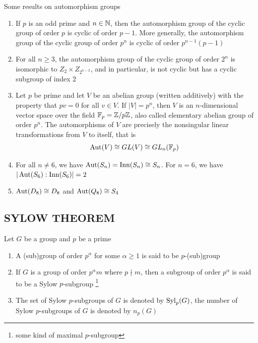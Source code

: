 \begin{proposition}
	Some results on automorphism groups
	\begin{enumerate}
		\item If $p$ is an odd prime and $n \in \mathbb{N}$, then the automorphism group of the cyclic group of order $p$ is cyclic of order $p-1$. More generally, the automorphism group of the cyclic group of order $p^n$ is cyclic of order $p^{n-1}(p-1)$
		\item For all $n \geq 3$, the automorphism group of the cyclic group of order $2^n$ is isomorphic to $Z_2 \times Z_{2^{n-2}}$, and in particular, is not cyclic but has a cyclic subgroup of index 2
		\item Let $p$ be prime and let $V$ be an abelian group (written additively) with the property that $pv = 0$ for all $v \in V$. If $|V| = p^n$, then $V$ is an $n$-dimensional vector space over the field $\mathbb{F}_p = \mathbb{Z} / p\mathbb{Z}$, also called elementary abelian group of order $p^n$. The automorphisms of $V$ are precisely the nonsingular linear transformations from $V$ to itself, that is
		\[
		\operatorname{Aut}(V) \cong GL(V) \cong GL_n(\mathbb{F}_p)
		\]
		\item For all $n \neq 6$, we have $\operatorname{Aut}(S_n) = \operatorname{Inn}(S_n) \cong S_n$. For $n = 6$, we have $|\operatorname{Aut}(S_6) : \operatorname{Inn}(S_6)| = 2$
		\item $\operatorname{Aut}(D_8) \cong D_8$ and $\operatorname{Aut}(Q_8) \cong S_4$
	\end{enumerate}
\end{proposition}

\subsection{SYLOW THEOREM}

\begin{definition}
	Let $G$ be a group and $p$ be a prime
	\begin{enumerate}
		\item A (sub)group of order $p^\alpha$ for some $\alpha \geq 1$ is said to be $p$-(sub)group
		\item If $G$ is a group of order $p^\alpha m$ where $p \nmid m$, then a subgroup of order $p^\alpha$ is said to be a Sylow $p$-subgroup \footnote{some kind of maximal $p$-subgroup}
		\item The set of Sylow $p$-subgroups of $G$ is denoted by $\operatorname{Syl}_p(G)$, the number of Sylow $p$-subgroups of $G$ is denoted by $n_p(G)$
	\end{enumerate}
\end{definition}

